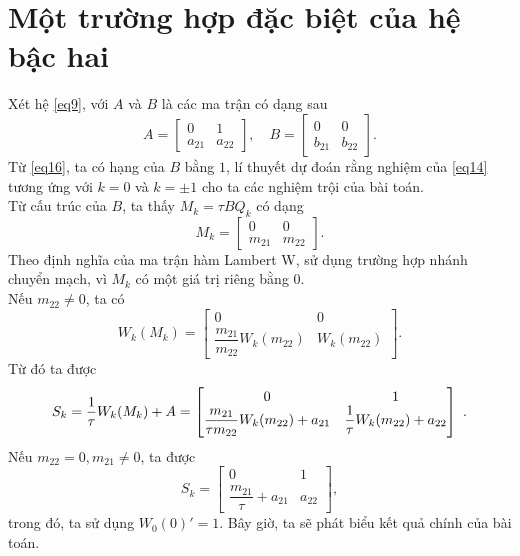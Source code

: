 \section{Một trường hợp đặc biệt của hệ bậc hai}\label{sec4}
Xét hệ \eqref{eq9}, với $A$ và $B$ là các ma trận có dạng sau
\begin{equation}\label{eq16}
	A= \begin{bmatrix}
		0 &1\\
		a_{21} &a_{22}
	\end{bmatrix}, \quad
	B= \begin{bmatrix}
		0 &0\\
		b_{21} &b_{22}
	\end{bmatrix}.
\end{equation}
Từ \eqref{eq16}, ta có hạng của $B$ bằng $1$, lí thuyết dự đoán rằng nghiệm của \eqref{eq14} tương ứng với $k =0$ và $k = \pm1$ cho ta các nghiệm trội của bài toán. \\
Từ cấu trúc của $B$, ta thấy $M_k = \tau B Q_k$ có dạng
\begin{equation}\label{eq17}
	M_k = \begin{bmatrix}
		0 &0\\
		m_{21} &m_{22}
	\end{bmatrix}.
\end{equation}
Theo định nghĩa của ma trận hàm Lambert W, sử dụng trường hợp nhánh chuyển mạch, vì $M_k$ có một giá trị riêng bằng $0$.\\
Nếu $m_{22} \ne 0$, ta có
\begin{equation}\label{eq18}
	W_k(M_k)= \begin{bmatrix}
		0 &0\\
		\dfrac{	m_{21}}{m_{22}} W_k(m_{22}) &W_k(m_{22})
	\end{bmatrix}.
\end{equation}
Từ đó ta được
\begin{equation}\label{eq19}
	S_k = \dfrac{1}{\tau}W_k(M_k)+A = 
	\begin{bmatrix} 0 &1\\
		\dfrac{	m_{21}}{\tau m_{22}} W_k(m_{22}) +a_{21} &\dfrac{1}{\tau}W_k(m_{22})+a_{22} \end{bmatrix}
	 \ .
\end{equation}
Nếu $m_{22}=0, m_{21} \ne 0$, ta được
\begin{equation}\label{eq20}
	S_k	= \begin{bmatrix}
		0 &1\\
		\dfrac{	m_{21}}{\tau} +a_{21} &a_{22}
	\end{bmatrix},
\end{equation}
trong đó, ta sử dụng $W_0 (0)' =1$. Bây giờ, ta sẽ phát biểu kết quả chính của bài toán.\\
